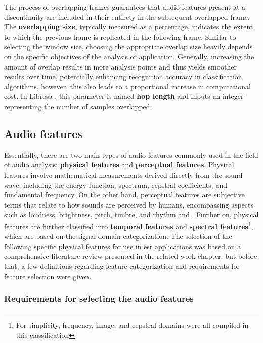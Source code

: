 The process of overlapping frames guarantees that audio features present at a discontinuity are included in their entirety in the subsequent overlapped frame. The \textbf{overlapping size}, typically measured as a percentage, indicates the extent to which the previous frame is replicated in the following frame. Similar to selecting the window size, choosing the appropriate overlap size heavily depends on the specific objectives of the analysis or application. Generally, increasing the amount of overlap results in more analysis points and thus yields smoother results over time, potentially enhancing recognition accuracy in classification algorithms, however, this also leads to a proportional increase in computational cost. In Librosa \cite{McFee2015librosa_sw}, this parameter is named \textbf{hop length} and inputs an integer representing the number of samples overlapped.


\subsection{Audio features}
\label{subsec:audio_fundamentals_audio_features}

Essentially, there are two main types of audio features commonly used in the field of audio analysis: \textbf{physical features} and \textbf{perceptual features}. Physical features involve mathematical measurements derived directly from the sound wave, including the energy function, spectrum, cepstral coefficients, and fundamental frequency. On the other hand, perceptual features are subjective terms that relate to how sounds are perceived by humans, encompassing aspects such as loudness, brightness, pitch, timbre, and rhythm \cite{Zhang2010} and \cite{Alias2016}. Further on, physical features are further classified into \textbf{temporal features} and \textbf{spectral features}\footnote{For simplicity, frequency, image, and cepstral domains were all compiled in this classification}, which are based on the signal domain categorization. The selection of the following specific physical features for use in \gls{esr} applications was based on a comprehensive literature review presented in the related work chapter, but before that, a few definitions regarding feature categorization and requirements for feature selection were given.


\subsubsection{Requirements for selecting the audio features}
\label{subsubsec:audio_features_requirements_for_selecting_features}

